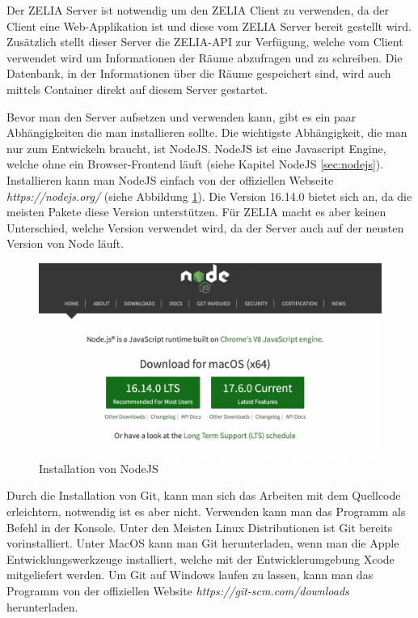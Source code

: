 
Der ZELIA Server ist notwendig um den ZELIA Client zu verwenden, da der Client eine Web-Applikation ist und diese vom ZELIA Server bereit gestellt wird. Zusätzlich stellt dieser Server die ZELIA-API zur Verfügung, welche vom Client verwendet wird um Informationen der Räume abzufragen und zu schreiben. Die Datenbank, in der Informationen über die Räume gespeichert sind, wird auch mittels Container direkt auf diesem Server gestartet.



Bevor man den Server aufsetzen und verwenden kann, gibt es ein paar Abhängigkeiten die man installieren sollte. Die wichtigste Abhängigkeit, die man nur zum Entwickeln braucht, ist NodeJS. NodeJS ist eine Javascript Engine, welche ohne ein Browser-Frontend läuft (siehe Kapitel NodeJS \ref{sec:nodejs}). Installieren kann man NodeJS einfach von der offiziellen Webseite \emph{https://nodejs.org/} (siehe Abbildung \ref{fig:nodejsdownload}). Die Version 16.14.0 bietet sich an, da die meisten Pakete diese Version unterstützen. Für ZELIA macht es aber keinen Unterschied, welche Version verwendet wird, da der Server auch auf der neusten Version von Node läuft.

\begin{figure}[H]
    \centering
    \includegraphics[width=120mm]{media/Handbuch/nodejs.png}
    \caption{Installation von NodeJS}
    \label{fig:nodejsdownload}
\end{figure}


Durch die Installation von Git, kann man sich das Arbeiten mit dem Quellcode erleichtern, notwendig ist es aber nicht. Verwenden kann man das Programm als Befehl in der Konsole. Unter den Meisten Linux Distributionen ist Git bereits vorinstalliert. Unter MacOS kann man Git herunterladen, wenn man die Apple Entwicklungswerkzeuge installiert, welche mit der Entwicklerumgebung Xcode mitgeliefert werden. Um Git auf Windows laufen zu lassen, kann man das Programm von der offiziellen Website \emph{https://git-scm.com/downloads} herunterladen.

